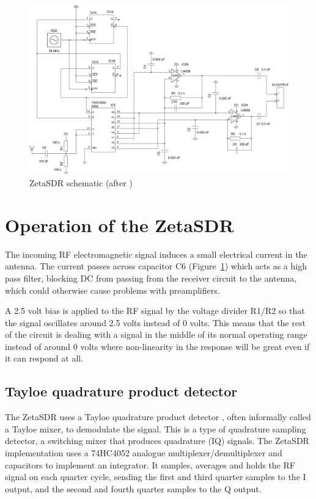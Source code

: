 \documentclass[11pt, twoside]{article}
\begin{document}
\begin{figure}
  \center
  \captionsetup{width=.8\linewidth}
  \includegraphics[width=.8\linewidth]{circuit.eps}
  \caption{ZetaSDR schematic (after \cite{ly1gp:2007})}
  \label{figure:schematic}
\end{figure}

\section{Operation of the ZetaSDR}

The incoming RF electromagnetic signal induces a small electrical
current in the antenna.  The current passes across capacitor C6
(Figure~\ref{figure:schematic}) which acts as a high pass filter,
blocking DC from passing from the receiver circuit to the antenna,
which could otherwise cause problems with preamplifiers.

A 2.5 volt bias is applied to the RF signal by the voltage divider
R1/R2 so that the signal oscillates around 2.5 volts instead of 0
volts.  This means that the rest of the circuit is dealing with a
signal in the middle of its normal operating range instead of around 0
volts where non-linearity in the response will be great even if it can
respond at all.

\subsection{Tayloe quadrature product detector}

The ZetaSDR uses a Tayloe quadrature product detector
\citep{Tayloe:2013, Tayloe:2001}, often informally called a Tayloe
mixer, to demodulate the signal.  This is a type of quadrature
sampling detector, a switching mixer that produces quadrature (IQ)
signals.  The ZetaSDR implementation uses a 74HC4052 analogue
multiplexer/demultiplexer and capacitors to implement an integrator.
It samples, averages and holds the RF signal on each quarter cycle,
sending the first and third quarter samples to the I output, and the
second and fourth quarter samples to the Q output.
\end{document}
